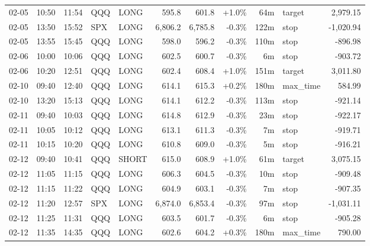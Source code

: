 \documentclass[11pt,a4paper,twoside]{article}
\begin{document}
\begin{center}
\begin{longtable}{>{\color{txtmain}}l l l l l r r r r >{\color{txtmain}}l r}
02-05 & 10:50 & 11:54 & QQQ & LONG & 595.8 & 601.8 & \textcolor{wingreen}{+1.0\%} & 64m & target & \textcolor{wingreen}{2,979.15} \\
02-05 & 13:50 & 15:52 & SPX & LONG & 6,806.2 & 6,785.8 & \textcolor{lossred}{-0.3\%} & 122m & stop & \textcolor{lossred}{-1,020.94} \\
02-05 & 13:55 & 15:45 & QQQ & LONG & 598.0 & 596.2 & \textcolor{lossred}{-0.3\%} & 110m & stop & \textcolor{lossred}{-896.98} \\
02-06 & 10:00 & 10:06 & QQQ & LONG & 602.5 & 600.7 & \textcolor{lossred}{-0.3\%} & 6m & stop & \textcolor{lossred}{-903.72} \\
02-06 & 10:20 & 12:51 & QQQ & LONG & 602.4 & 608.4 & \textcolor{wingreen}{+1.0\%} & 151m & target & \textcolor{wingreen}{3,011.80} \\
02-10 & 09:40 & 12:40 & QQQ & LONG & 614.1 & 615.3 & \textcolor{wingreen}{+0.2\%} & 180m & max\_time & \textcolor{wingreen}{584.99} \\
02-10 & 13:20 & 15:13 & QQQ & LONG & 614.1 & 612.2 & \textcolor{lossred}{-0.3\%} & 113m & stop & \textcolor{lossred}{-921.14} \\
02-11 & 09:40 & 10:03 & QQQ & LONG & 614.8 & 612.9 & \textcolor{lossred}{-0.3\%} & 23m & stop & \textcolor{lossred}{-922.17} \\
02-11 & 10:05 & 10:12 & QQQ & LONG & 613.1 & 611.3 & \textcolor{lossred}{-0.3\%} & 7m & stop & \textcolor{lossred}{-919.71} \\
02-11 & 10:15 & 10:20 & QQQ & LONG & 610.8 & 609.0 & \textcolor{lossred}{-0.3\%} & 5m & stop & \textcolor{lossred}{-916.21} \\
02-12 & 09:40 & 10:41 & QQQ & SHORT & 615.0 & 608.9 & \textcolor{wingreen}{+1.0\%} & 61m & target & \textcolor{wingreen}{3,075.15} \\
02-12 & 11:05 & 11:15 & QQQ & LONG & 606.3 & 604.5 & \textcolor{lossred}{-0.3\%} & 10m & stop & \textcolor{lossred}{-909.48} \\
02-12 & 11:15 & 11:22 & QQQ & LONG & 604.9 & 603.1 & \textcolor{lossred}{-0.3\%} & 7m & stop & \textcolor{lossred}{-907.35} \\
02-12 & 11:20 & 12:57 & SPX & LONG & 6,874.0 & 6,853.4 & \textcolor{lossred}{-0.3\%} & 97m & stop & \textcolor{lossred}{-1,031.11} \\
02-12 & 11:25 & 11:31 & QQQ & LONG & 603.5 & 601.7 & \textcolor{lossred}{-0.3\%} & 6m & stop & \textcolor{lossred}{-905.28} \\
02-12 & 11:35 & 14:35 & QQQ & LONG & 602.6 & 604.2 & \textcolor{wingreen}{+0.3\%} & 180m & max\_time & \textcolor{wingreen}{790.00} \\

\end{longtable}
\end{center}
\end{document}
